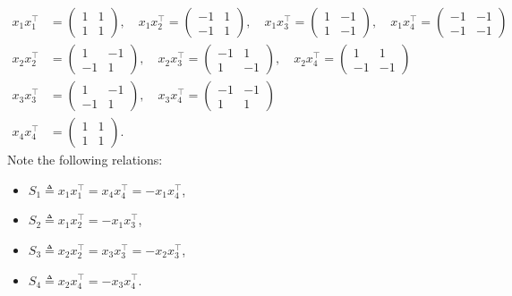 \documentclass{article}
\begin{document}
\begin{align}
  x_1 x_1^\top &= \begin{pmatrix} 1 & 1 \\ 1 & 1 \end{pmatrix}, \quad
  x_1 x_2^\top = \begin{pmatrix} -1 & 1 \\ -1 & 1 \end{pmatrix}, \quad
  x_1 x_3^\top = \begin{pmatrix} 1 & -1 \\ 1 & -1 \end{pmatrix}, \quad
  x_1 x_4^\top = \begin{pmatrix} -1 & -1 \\ -1 & -1 \end{pmatrix} \\
  x_2 x_2^\top &= \begin{pmatrix} 1 & -1 \\ -1 & 1 \end{pmatrix}, \quad
  x_2 x_3^\top = \begin{pmatrix} -1 & 1 \\ 1 & -1 \end{pmatrix}, \quad
  x_2 x_4^\top = \begin{pmatrix} 1 & 1 \\ -1 & -1 \end{pmatrix} \\
  x_3 x_3^\top &= \begin{pmatrix} 1 & -1 \\ -1 & 1 \end{pmatrix}, \quad
  x_3 x_4^\top = \begin{pmatrix} -1 & -1 \\ 1 & 1 \end{pmatrix} \\
  x_4 x_4^\top &= \begin{pmatrix} 1 & 1 \\ 1 & 1 \end{pmatrix}.
\end{align}
Note the following relations:
\begin{itemize}
  \item $S_1 \triangleq x_1 x_1^\top = x_4 x_4^\top = - x_1 x_4^\top$,
  \item $S_2 \triangleq x_1 x_2^\top = - x_1 x_3^\top$,
  \item $S_3 \triangleq x_2 x_2^\top = x_3 x_3^\top = -x_2 x_3^\top$,
  \item $S_4 \triangleq x_2 x_4^\top = -x_3 x_4^\top$.
\end{itemize}
\end{document}
